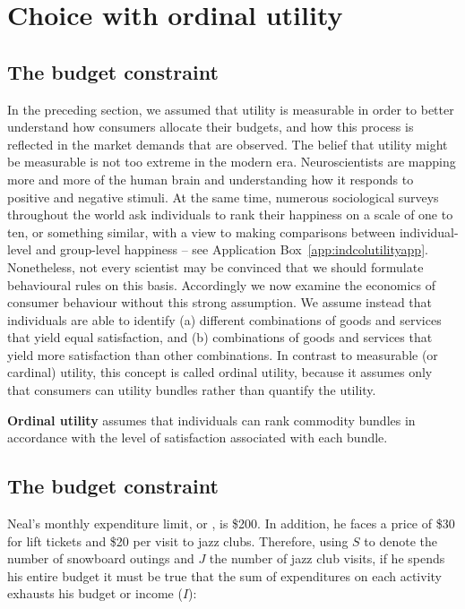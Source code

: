 \section{Choice with ordinal utility}\label{sec:ch6sec3}

\subsection*{The budget constraint}

In the preceding section, we assumed that utility is measurable in order to
better understand how consumers allocate their budgets, and how this process
is reflected in the market demands that are observed. The belief that
utility might be measurable is not too extreme in the modern era.
Neuroscientists are mapping more and more of the human brain and
understanding how it responds to positive and negative stimuli. At the same
time, numerous sociological surveys throughout the world ask individuals to
rank their happiness on a scale of one to ten, or something similar, with a
view to making comparisons between individual-level and group-level
happiness -- see Application Box~\ref{app:indcolutilityapp}. 
Nonetheless, not every scientist may be convinced that we should
formulate behavioural rules on this basis. Accordingly we now examine the
economics of consumer behaviour without this strong assumption. We assume
instead that individuals are able to identify (a) different combinations of
goods and services that yield equal satisfaction, and (b) combinations of
goods and services that yield more satisfaction than other combinations. In
contrast to measurable (or cardinal) utility, this concept is called ordinal
utility, because it assumes only that consumers can  utility
bundles rather than quantify the utility.

\begin{DefBox}
	\textbf{Ordinal utility} assumes that individuals can rank commodity bundles in accordance with the level of satisfaction associated with each bundle.
\end{DefBox}

\newhtmlpage

\subsection*{The budget constraint}

Neal's monthly expenditure limit, or , is
\$200. In addition, he faces a price of \$30 for lift tickets and \$20 per
visit to jazz clubs. Therefore, using $S$ to denote the number of snowboard
outings and $J$ the number of jazz club visits, if he spends his entire
budget it must be true that the sum of expenditures on each activity
exhausts his budget or income ($I$):

